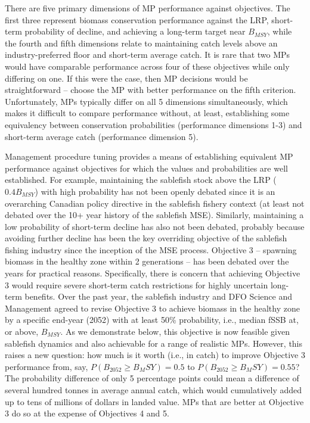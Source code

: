 \documentclass[11pt]{book}
\begin{document}
There are five primary dimensions of MP performance against objectives. The first three represent biomass conservation performance against the LRP, short-term probability of decline, and achieving a long-term target near \(B_{MSY}\), while the fourth and fifth dimensions relate to maintaining catch levels above an industry-preferred floor and short-term average catch. It is rare that two MPs would have comparable performance across four of these objectives while only differing on one. If this were the case, then MP decisions would be straightforward -- choose the MP with better performance on the fifth criterion. Unfortunately, MPs typically differ on all 5 dimensions simultaneously, which makes it difficult to compare performance without, at least, establishing some equivalency between conservation probabilities (performance dimensions 1-3) and short-term average catch (performance dimension 5).

Management procedure tuning provides a means of establishing equivalent MP performance against objectives for which the values and probabilities are well established. For example, maintaining the sablefish stock above the LRP (\(0.4B_{MSY}\)) with high probability has not been openly debated since it is an overarching Canadian policy directive in the sablefish fishery context (at least not debated over the 10+ year history of the sablefish MSE). Similarly, maintaining a low probability of short-term decline has also not been debated, probably because avoiding further decline has been the key overriding objective of the sablefish fishing industry since the inception of the MSE process. Objective 3 -- spawning biomass in the healthy zone within 2 generations -- has been debated over the years for practical reasons. Specifically, there is concern that achieving Objective 3 would require severe short-term catch restrictions for highly uncertain long-term benefits. Over the past year, the sablefish industry and DFO Science and Management agreed to revise Objective 3 to achieve biomass in the healthy zone by a specific end-year (2052) with at least 50\% probability, i.e., median fSSB at, or above, \(B_{MSY}\). As we demonstrate below, this objective is now feasible given sablefish dynamics and also achievable for a range of realistic MPs. However, this raises a new question: how much is it worth (i.e., in catch) to improve Objective 3 performance from, say, \(P(B_{2052} \geq B_MSY) = 0.5\) to \(P(B_{2052} \geq B_MSY) = 0.55\)? The probability difference of only 5 percentage points could mean a difference of several hundred tonnes in average annual catch, which would cumulatively added up to tens of millions of dollars in landed value. MPs that are better at Objective 3 do so at the expense of Objectives 4 and 5.
\end{document}
